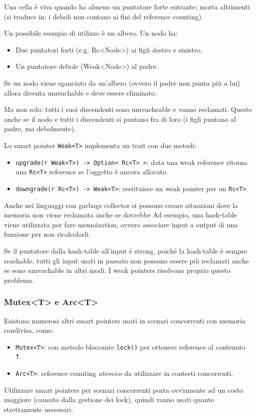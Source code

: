 \documentclass{article}
\begin{document}
Una cella è viva quando ha almeno un puntatore forte entrante; morta altrimenti (si traduce in: i deboli non contano ai fini del reference counting).

Un possibile esempio di utilizzo è un albero. Un nodo ha:
\begin{itemize}
    \item Due puntatori forti (e.g. Rc<Node>) ai figli destro e sinistro.
    \item Un puntatore debole (Weak<Node>) al padre.
\end{itemize}

Se un nodo viene sganciato da un’albero (ovvero il padre non punta più a lui) allora diventa unreachable e deve essere eliminato.

Ma non solo: tutti i suoi discendenti sono unreacheable e vanno reclamati. Questo anche se il nodo e tutti i discendenti si puntano fra di loro (i figli puntano al padre, ma debolmente).

Lo smart pointer \texttt{Weak<T>} implementa un trait con due metodi:
\begin{itemize}
    \item \texttt{upgrade(r Weak<T>) -> Option< Rc<T> >}: data una weak reference ritorna una \texttt{Rc<T>} reference se l’oggetto è ancora allocato.
    \item \texttt{downgrade(r Rc<T>) -> Weak<T>}: restituisce un weak pointer per un \texttt{Rc<T>}.
\end{itemize}
\vspace{8pt}
Anche nei linguaggi con garbage collector si possono creare situazioni dove la memoria non viene reclamata anche se dovrebbe Ad esempio, una hash-table viene utilizzata per fare memoization, ovvero associare input a output di una funzione per non ricalcolarli.

Se il puntatore dalla hash-table all’input è strong, poiché la hash-table è sempre reachable, tutti gli input usati in passato non possono essere più reclamati anche se sono unreachable in altri modi. I weak pointers risolvono proprio questo problema.

\subsubsection*{Mutex<T> e Arc<T>}
Esistono numerosi altri smart pointers usati in scenari concorrenti con memoria condivisa, come:
\begin{itemize}
    \item \texttt{Mutex<T>}: con metodo bloccante \texttt{lock()} per ottenere reference al contenuto \texttt{T}.
    \item \texttt{Arc<T>}: reference counting \textit{atomico} da utilizzare in contesti concorrenti.
\end{itemize}
Utilizzare smart pointers per scenari concorrenti porta ovviamente ad un costo maggiore (causato dalla gestione dei lock), quindi vanno usati quanto strettamente necessari.
\end{document}
